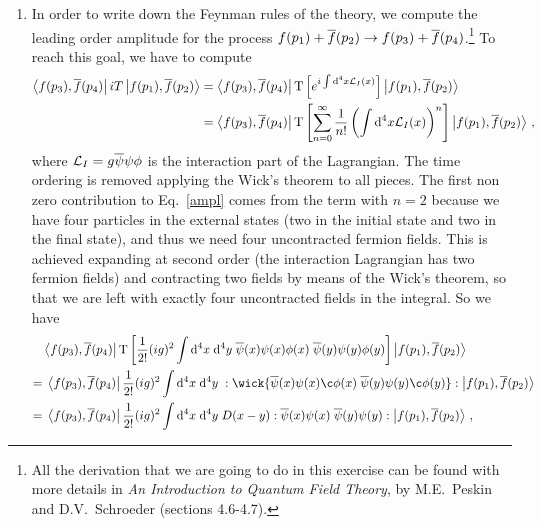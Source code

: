 \begin{sol}
    \begin{enumerate}[label=\alph*)]
        \item In order to write down the Feynman rules of the theory, we compute the leading order amplitude for the process $f(p_1)+\overline{f}(p_2)\rightarrow f(p_3)+\overline{f}(p_4)$.\footnote{All the derivation that we are going to do in this exercise can be found with more details in \emph{An Introduction to Quantum Field Theory}, by M.E.~Peskin and D.V.~Schroeder (sections 4.6-4.7).}
        To reach this goal, we have to compute
        \begin{align}
            \bra{f(p_3),\overline{f}(p_4)}iT \ket{f(p_1), \overline{f}(p_2)} &= \bra{f(p_3),\overline{f}(p_4)} \mathbf{\rm T} \left[e^{i\int {\rm d}^4 x \mathcal{L}_I(x)}\right]\ket{f(p_1), \overline{f}(p_2)} \notag \\
            & = \bra{f(p_3),\overline{f}(p_4)} \mathbf{\rm T} \left[ \sum_{n=0}^\infty \frac{1}{n!}\left(\int {\rm d}^4x \mathcal{L}_I(x)\right)^n\right]\ket{f(p_1), \overline{f}(p_2)} \label{ampl}\,,
        \end{align}
        where $\mathcal{L}_I=g\overline{\psi} \psi \phi$ is the interaction part of the Lagrangian.
        The time ordering is removed applying the Wick's theorem to all pieces.
        The first non zero contribution to Eq.~\eqref{ampl} comes from the term with $n=2$ because we have four particles in the external states (two in the initial state and two in the final state), and thus we need four uncontracted fermion fields. This is achieved expanding at second order (the interaction Lagrangian has two fermion fields) and contracting two fields by means of the Wick's theorem, so that we are left with exactly four uncontracted fields in the integral. So we have
        \begin{align}
            & \bra{f(p_3),\sbar{f}(p_4)} \T \left[ \frac{1}{2!}(ig)^2 \int \rmd^4x \; \rmd^4y \; \sbar{\psi}(x) \psi(x) \phi(x) \;\sbar{\psi}(y) \psi(y) \phi(y) \right]\ket{f(p_1), \sbar{f}(p_2)} \notag \\
            = &\; \bra{f(p_3),\sbar{f}(p_4)} \frac{1}{2!}(ig)^2 \int \rmd^4x \; \rmd^4y \; : \wick{ \sbar{\psi}(x) \psi(x) \c \phi(x) \; \sbar{\psi}(y)  \psi(y) \c \phi(y)} : \ket{f(p_1), \sbar{f}(p_2)} \notag \\
            = &\; \bra{f(p_3),\sbar{f}(p_4)} \frac{1}{2!}(ig)^2 \int \rmd^4x \; \rmd^4y \; D(x-y): \sbar{\psi}(x) \psi(x) \; \sbar{\psi}(y)  \psi(y) : \ket{f(p_1), \sbar{f}(p_2)} \,, \label{wick_contracion}
        \end{align}

\end{enumerate}
\end{sol}
